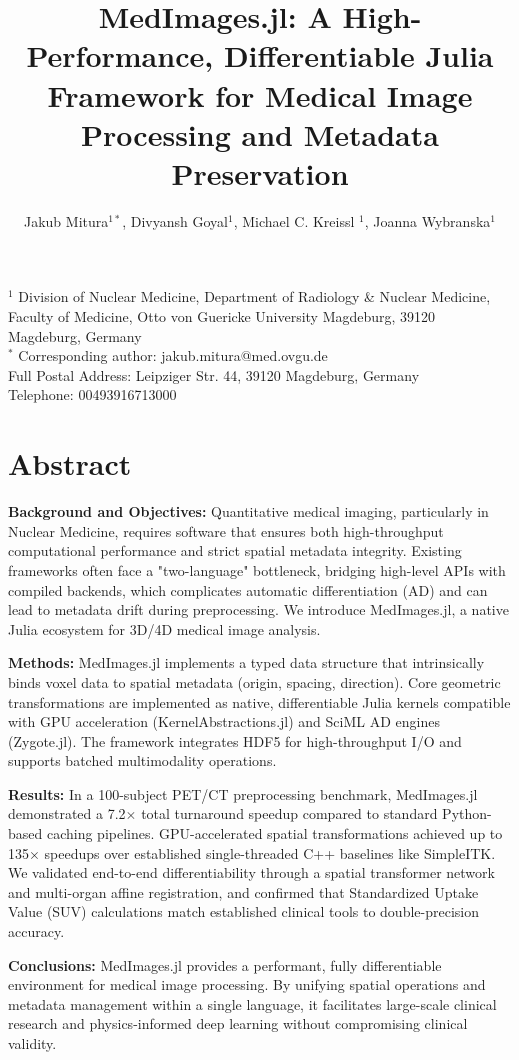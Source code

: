 \documentclass[10pt,letterpaper]{article}
\title{MedImages.jl: A High-Performance, Differentiable Julia Framework for Medical Image Processing and Metadata Preservation}
\author{Jakub Mitura$^{1*}$, Divyansh Goyal$^{1}$,  Michael C. Kreissl $^{1}$, Joanna Wybranska$^{1}$}
\date{}
\begin{document}
\maketitle

\noindent
$^{1}$ Division of Nuclear Medicine, Department of Radiology \& Nuclear Medicine, Faculty of Medicine, Otto von Guericke University Magdeburg, 39120 Magdeburg, Germany \\
$^{*}$ Corresponding author: jakub.mitura@med.ovgu.de \\
Full Postal Address: Leipziger Str. 44, 39120 Magdeburg, Germany \\
Telephone: 00493916713000

\section*{Abstract}
\textbf{Background and Objectives:} Quantitative medical imaging, particularly in Nuclear Medicine, requires software that ensures both high-throughput computational performance and strict spatial metadata integrity. Existing frameworks often face a "two-language" bottleneck, bridging high-level APIs with compiled backends, which complicates automatic differentiation (AD) and can lead to metadata drift during preprocessing. We introduce MedImages.jl, a native Julia ecosystem for 3D/4D medical image analysis.

\textbf{Methods:} MedImages.jl implements a typed data structure that intrinsically binds voxel data to spatial metadata (origin, spacing, direction). Core geometric transformations are implemented as native, differentiable Julia kernels compatible with GPU acceleration (KernelAbstractions.jl) and SciML AD engines (Zygote.jl). The framework integrates HDF5 for high-throughput I/O and supports batched multimodality operations.

\textbf{Results:} In a 100-subject PET/CT preprocessing benchmark, MedImages.jl demonstrated a 7.2$\times$ total turnaround speedup compared to standard Python-based caching pipelines. GPU-accelerated spatial transformations achieved up to 135$\times$ speedups over established single-threaded C++ baselines like SimpleITK. We validated end-to-end differentiability through a spatial transformer network and multi-organ affine registration, and confirmed that Standardized Uptake Value (SUV) calculations match established clinical tools to double-precision accuracy.

\textbf{Conclusions:} MedImages.jl provides a performant, fully differentiable environment for medical image processing. By unifying spatial operations and metadata management within a single language, it facilitates large-scale clinical research and physics-informed deep learning without compromising clinical validity.
\end{document}
